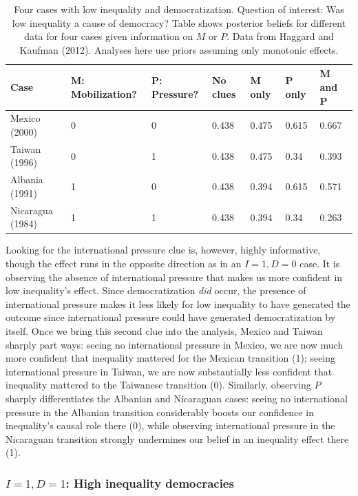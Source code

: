 \documentclass[
  12pt,
]{book}
\begin{document}
\begin{table}

\caption{\label{tab:HK8cases1}Four cases with low inequality and  democratization. Question of interest: Was low inequality a cause of democracy? Table shows posterior beliefs for different data for four cases given information on $M$ or $P$. Data from Haggard and Kaufman (2012). Analyses here use priors assuming only monotonic effects.}
\centering
\begin{tabular}[t]{l|l|l|l|l|l|l}
\hline
Case & M: Mobilization? & P: Pressure? & No clues & M only & P only & M and P\\
\hline
Mexico (2000) & 0 & 0 & 0.438 & 0.475 & 0.615 & 0.667\\
\hline
Taiwan (1996) & 0 & 1 & 0.438 & 0.475 & 0.34 & 0.393\\
\hline
Albania (1991) & 1 & 0 & 0.438 & 0.394 & 0.615 & 0.571\\
\hline
Nicaragua (1984) & 1 & 1 & 0.438 & 0.394 & 0.34 & 0.263\\
\hline
\end{tabular}
\end{table}

Looking for the international pressure clue is, however, highly informative, though the effect runs in the opposite direction as in an \(I=1, D=0\) case. It is observing the absence of international pressure that makes us more confident in low inequality's effect. Since democratization \emph{did} occur, the presence of international pressure makes it less likely for low inequality to have generated the outcome since international pressure could have generated democratization by itself. Once we bring this second clue into the analysis, Mexico and Taiwan sharply part ways: seeing no international pressure in Mexico, we are now much more confident that inequality mattered for the Mexican transition (1); seeing international pressure in Taiwan, we are now substantially less confident that inequality mattered to the Taiwanese transition (0). Similarly, observing \(P\) sharply differentiates the Albanian and Nicaraguan cases: seeing no international pressure in the Albanian transition considerably boosts our confidence in inequality's causal role there (0), while observing international pressure in the Nicaraguan transition strongly undermines our belief in an inequality effect there (1).

\hypertarget{i1-d1-high-inequality-democracies}{%
\subsubsection{\texorpdfstring{\(I=1, D=1\): High inequality democracies}{I=1, D=1: High inequality democracies}}\label{i1-d1-high-inequality-democracies}}
\end{document}
